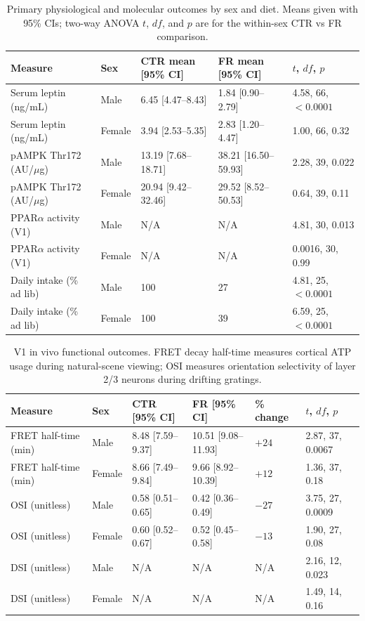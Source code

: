 \documentclass[11pt]{article}
\begin{document}
\begin{table}[htbp]
\centering
\caption{Primary physiological and molecular outcomes by sex and diet. Means given with 95\% CIs; two-way ANOVA $t$, $df$, and $p$ are for the within-sex CTR vs FR comparison.}
\label{tab:primary}
\begin{tabular}{lllll}
\toprule
Measure & Sex & CTR mean [95\% CI] & FR mean [95\% CI] & $t$, $df$, $p$ \\
\midrule
Serum leptin (ng/mL) & Male & 6.45 [4.47--8.43] & 1.84 [0.90--2.79] & 4.58, 66, $<0.0001$ \\
Serum leptin (ng/mL) & Female & 3.94 [2.53--5.35] & 2.83 [1.20--4.47] & 1.00, 66, 0.32 \\
pAMPK Thr172 (AU/$\mu$g) & Male & 13.19 [7.68--18.71] & 38.21 [16.50--59.93] & 2.28, 39, 0.022 \\
pAMPK Thr172 (AU/$\mu$g) & Female & 20.94 [9.42--32.46] & 29.52 [8.52--50.53] & 0.64, 39, 0.11 \\
PPAR$\alpha$ activity (V1) & Male & N/A & N/A & 4.81, 30, 0.013 \\
PPAR$\alpha$ activity (V1) & Female & N/A & N/A & 0.0016, 30, 0.99 \\
Daily intake (\% ad lib) & Male & 100 & 27 & 4.81, 25, $<0.0001$ \\
Daily intake (\% ad lib) & Female & 100 & 39 & 6.59, 25, $<0.0001$ \\
\bottomrule
\end{tabular}
\end{table}

\begin{table}[htbp]
\centering
\caption{V1 in vivo functional outcomes. FRET decay half-time measures cortical ATP usage during natural-scene viewing; OSI measures orientation selectivity of layer 2/3 neurons during drifting gratings.}
\label{tab:functional}
\begin{tabular}{llllll}
\toprule
Measure & Sex & CTR [95\% CI] & FR [95\% CI] & \% change & $t$, $df$, $p$ \\
\midrule
FRET half-time (min) & Male & 8.48 [7.59--9.37] & 10.51 [9.08--11.93] & $+24$ & 2.87, 37, 0.0067 \\
FRET half-time (min) & Female & 8.66 [7.49--9.84] & 9.66 [8.92--10.39] & $+12$ & 1.36, 37, 0.18 \\
OSI (unitless) & Male & 0.58 [0.51--0.65] & 0.42 [0.36--0.49] & $-27$ & 3.75, 27, 0.0009 \\
OSI (unitless) & Female & 0.60 [0.52--0.67] & 0.52 [0.45--0.58] & $-13$ & 1.90, 27, 0.08 \\
DSI (unitless) & Male & N/A & N/A & N/A & 2.16, 12, 0.023 \\
DSI (unitless) & Female & N/A & N/A & N/A & 1.49, 14, 0.16 \\
\bottomrule
\end{tabular}
\end{table}
\end{document}
